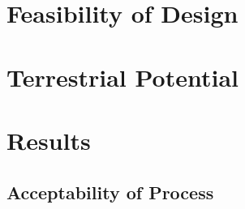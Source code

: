 \documentclass{../tex/report}
\begin{document}
\section{Feasibility of Design}


\section{Terrestrial Potential}

\section{Results}

\subsection{Acceptability of Process}
\end{document}

